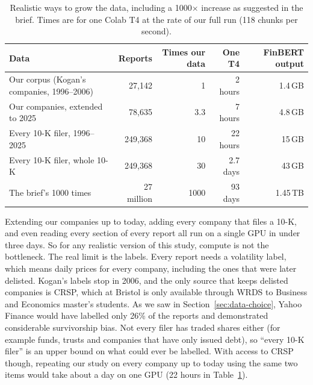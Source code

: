 \documentclass[11pt,a4paper]{article}
\begin{document}
\begin{table}[ht]
  \centering
  \small
  \caption{Realistic ways to grow the data, including a 1000$\times$ increase as suggested in the brief. Times are for one Colab T4 at the rate of our full run (118 chunks per second).}\label{tab:ladder}
  \begin{tabular}{@{}lrrrr@{}}
    \toprule
    Data & Reports & Times our data & One T4 & FinBERT output \\
    \midrule
    Our corpus (Kogan's companies, 1996--2006) & 27,142 & 1 & 2 hours & 1.4\,GB \\
    Our companies, extended to 2025 & 78,635 & 3.3 & 7 hours & 4.8\,GB \\
    Every 10-K filer, 1996--2025 & 249,368 & 10 & 22 hours & 15\,GB \\
    Every 10-K filer, whole 10-K & 249,368 & 30 & 2.7 days & 43\,GB \\
    The brief's 1000 times & 27 million & 1000 & 93 days & 1.45\,TB \\
    \bottomrule
  \end{tabular}
\end{table}

Extending our companies up to today, adding every company that files a 10-K, and even reading every section of every report all run on a single GPU in under three days. So for any realistic version of this study, compute is not the bottleneck. The real limit is the labels. Every report needs a volatility label, which means daily prices for every company, including the ones that were later delisted. Kogan's labels stop in 2006, and the only source that keeps delisted companies is CRSP, which at Bristol is only available through WRDS to Business and Economics master's students. As we saw in Section~\ref{sec:data-choice}, Yahoo Finance would have labelled only 26\% of the reports and demonstrated considerable survivorship bias. Not every filer has traded shares either (for example funds, trusts and companies that have only issued debt), so ``every 10-K filer'' is an upper bound on what could ever be labelled. With access to CRSP though, repeating our study on every company up to today using the same two items would take about a day on one GPU (22 hours in Table~\ref{tab:ladder}).
\end{document}
